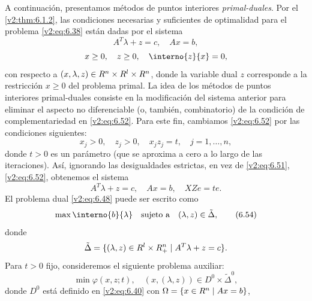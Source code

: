 A continuación, presentamos métodos de puntos interiores \textit{primal-duales}. Por el \cref{v2:thm:6.1.2}, las condiciones necesarias y suficientes de optimalidad para el problema \eqref{v2:eq:6.38} están dadas por el sistema
\begin{equation}
    A^T \lambda + z = c, \quad Ax = b,
    \label{v2:eq:6.51}
\end{equation}
\begin{equation}
    x \ge 0, \quad z \ge 0, \quad \interno{z}{x} = 0,
    \label{v2:eq:6.52}
\end{equation}
con respecto a $(x, \lambda, z) \in R^n \times R^l \times R^n$, donde la variable dual $z$ corresponde a la restricción $x \ge 0$ del problema primal. La idea de los métodos de puntos interiores primal-duales consiste en la modificación del sistema anterior para eliminar el aspecto no diferenciable (o, también, combinatorio) de la condición de complementariedad en \eqref{v2:eq:6.52}. Para este fin, cambiamos \eqref{v2:eq:6.52} por las condiciones siguientes:
\begin{equation}
    x_j > 0, \quad z_j > 0, \quad x_j z_j = t, \quad j = 1, \dots, n,
    \label{v2:eq:6.53}
\end{equation}
donde $t > 0$ es un parámetro (que se aproxima a cero a lo largo de las iteraciones). Así, ignorando las desigualdades estrictas, en vez de \eqref{v2:eq:6.51}, \eqref{v2:eq:6.52}, obtenemos el sistema
\begin{equation}
    A^T \lambda + z = c, \quad Ax = b, \quad XZe = te.
    \label{v2:eq:6.54} %
\end{equation}
El problema dual \eqref{v2:eq:6.48} puede ser escrito como
\begin{equation}
    \max \interno{b}{\lambda} \quad \text{sujeto a} \quad (\lambda, z) \in \tilde{\Delta},
    \tag{6.54}\label{v2:eq:6.54_dual} %
\end{equation}
donde
\begin{equation}
    \tilde{\Delta} = \{ (\lambda, z) \in R^l \times R^n_+ \mid A^T \lambda + z = c \}.
    \label{v2:eq:6.55}
\end{equation}
Para $t > 0$ fijo, consideremos el siguiente problema auxiliar:
\begin{equation}
    \min \varphi(x, z; t), \quad (x, (\lambda, z)) \in D^0 \times \tilde{\Delta}^0,
    \label{v2:eq:6.56}
\end{equation}
donde $D^0$ está definido en \eqref{v2:eq:6.40} con $\Omega = \{ x \in R^n \mid Ax = b \}$,
